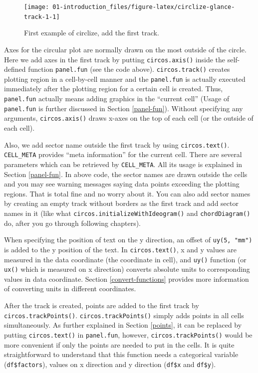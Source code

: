 \documentclass[]{book}
\theoremstyle{definition}
\theoremstyle{definition}
\theoremstyle{remark}
\begin{document}
\begin{figure}

{\centering \texttt{[image: 01-introduction\_files/figure-latex/circlize-glance-track-1-1]} 

}

\caption{First example of circlize, add the first track.}\label{fig:circlize-glance-track-1}
\end{figure}

Axes for the circular plot are normally drawn on the most outside of the
circle. Here we add axes in the first track by putting
\texttt{circos.axis()} inside the self-defined function
\texttt{panel.fun} (see the code above). \texttt{circos.track()} creates
plotting region in a cell-by-cell manner and the \texttt{panel.fun} is
actually executed immediately after the plotting region for a certain
cell is created. Thus, \texttt{panel.fun} actually means adding graphics
in the ``current cell'' (Usage of \texttt{panel.fun} is further
discussed in Section \ref{panel-fun}). Without specifying any arguments,
\texttt{circos.axis()} draws x-axes on the top of each cell (or the
outside of each cell).

Also, we add sector name outside the first track by using
\texttt{circos.text()}. \texttt{CELL\_META} provides ``meta
information'' for the current cell. There are several parameters which
can be retrieved by \texttt{CELL\_META}. All its usage is explained in
Section \ref{panel-fun}. In above code, the sector names are drawn
outside the cells and you may see warning messages saying data points
exceeding the plotting regions. That is total fine and no worry about
it. You can also add sector names by creating an empty track without
borders as the first track and add sector names in it (like what
\texttt{circos.initializeWithIdeogram()} and \texttt{chordDiagram()} do,
after you go through following chapters).

When specifying the position of text on the y direction, an offset of
\texttt{uy(5,\ "mm")} is added to the y position of the text. In
\texttt{circos.text()}, x and y values are measured in the data
coordinate (the coordinate in cell), and \texttt{uy()} function (or
\texttt{ux()} which is measured on x direction) converts absolute units
to corresponding values in data coordinate. Section
\ref{convert-functions} provides more information of converting units in
different coordinates.

After the track is created, points are added to the first track by
\texttt{circos.trackPoints()}. \texttt{circos.trackPoints()} simply adds
points in all cells simultaneously. As further explained in Section
\ref{points}, it can be replaced by putting \texttt{circos.text()} in
\texttt{panel.fun}, however, \texttt{circos.trackPoints()} would be more
convenient if only the points are needed to put in the cells. It is
quite straightforward to understand that this function needs a
categorical variable (\texttt{df\$factors}), values on x direction and y
direction (\texttt{df\$x} and \texttt{df\$y}).
\end{document}
